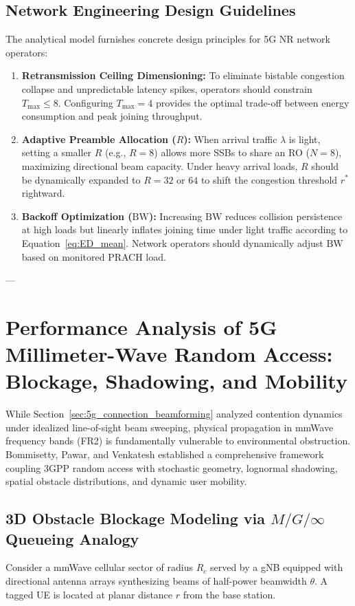 \subsection{Network Engineering Design Guidelines}
The analytical model furnishes concrete design principles for 5G NR network operators:
\begin{enumerate}
    \item \textbf{Retransmission Ceiling Dimensioning:} To eliminate bistable congestion collapse and unpredictable latency spikes, operators should constrain $T_{\max} \le 8$. Configuring $T_{\max} = 4$ provides the optimal trade-off between energy consumption and peak joining throughput.
    \item \textbf{Adaptive Preamble Allocation ($R$):} When arrival traffic $\lambda$ is light, setting a smaller $R$ (e.g., $R = 8$) allows more SSBs to share an RO ($N = 8$), maximizing directional beam capacity. Under heavy arrival loads, $R$ should be dynamically expanded to $R = 32$ or $64$ to shift the congestion threshold $r^*$ rightward.
    \item \textbf{Backoff Optimization ($\mathrm{BW}$):} Increasing $\mathrm{BW}$ reduces collision persistence at high loads but linearly inflates joining time under light traffic according to Equation~\eqref{eq:ED_mean}. Network operators should dynamically adjust $\mathrm{BW}$ based on monitored PRACH load.
\end{enumerate}

---

\section{Performance Analysis of 5G Millimeter-Wave Random Access: Blockage, Shadowing, and Mobility}
\label{sec:5g_mmwave_blockage}

While Section~\ref{sec:5g_connection_beamforming} analyzed contention dynamics under idealized line-of-sight beam sweeping, physical propagation in mmWave frequency bands (FR2) is fundamentally vulnerable to environmental obstruction. Bommisetty, Pawar, and Venkatesh \cite{bommisetty2022mmwave} established a comprehensive framework coupling 3GPP random access with stochastic geometry, lognormal shadowing, spatial obstacle distributions, and dynamic user mobility.

\subsection{3D Obstacle Blockage Modeling via $M/G/\infty$ Queueing Analogy}
Consider a mmWave cellular sector of radius $R_c$ served by a gNB equipped with directional antenna arrays synthesizing beams of half-power beamwidth $\theta$. A tagged UE is located at planar distance $r$ from the base station.

